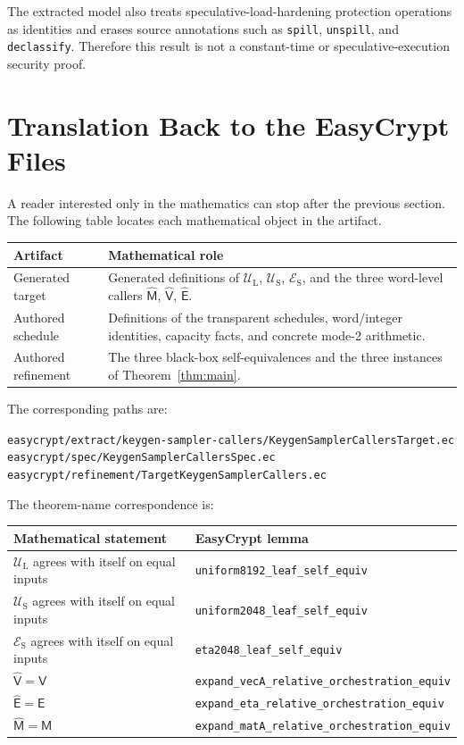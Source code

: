 \documentclass[11pt]{article}
\theoremstyle{definition}
\theoremstyle{plain}
\theoremstyle{remark}
\newcommand{\code}[1]{\nolinkurl{#1}}
\newcommand{\UL}{\mathcal U_{\mathrm L}}
\newcommand{\US}{\mathcal U_{\mathrm S}}
\newcommand{\ES}{\mathcal E_{\mathrm S}}
\newcommand{\SchedMat}{\mathsf M}
\newcommand{\SchedVec}{\mathsf V}
\newcommand{\SchedEta}{\mathsf E}
\newcommand{\GenMat}{\widehat{\mathsf M}}
\newcommand{\GenVec}{\widehat{\mathsf V}}
\newcommand{\GenEta}{\widehat{\mathsf E}}
\begin{document}
The extracted model also treats speculative-load-hardening protection
operations as identities and erases source annotations such as
\code{spill}, \code{unspill}, and \code{declassify}.  Therefore this result is
not a constant-time or speculative-execution security proof.

\section{Translation Back to the EasyCrypt Files}

A reader interested only in the mathematics can stop after the previous
section.  The following table locates each mathematical object in the artifact.

\noindent\begin{tabularx}{\textwidth}{>{\raggedright\arraybackslash}p{}X}
\toprule
Artifact & Mathematical role \\
\midrule
Generated target & Generated definitions of $\UL$, $\US$, $\ES$, and the three word-level
callers $\GenMat$, $\GenVec$, $\GenEta$. \\
Authored schedule & Definitions of the transparent schedules, word/integer identities, capacity
facts, and concrete mode-2 arithmetic. \\
Authored refinement & The three black-box self-equivalences and the three instances of
Theorem~\ref{thm:main}. \\
\bottomrule
\end{tabularx}

The corresponding paths are:
\begin{center}
\footnotesize
\code{easycrypt/extract/keygen-sampler-callers/KeygenSamplerCallersTarget.ec}\\
\code{easycrypt/spec/KeygenSamplerCallersSpec.ec}\\
\code{easycrypt/refinement/TargetKeygenSamplerCallers.ec}
\end{center}

The theorem-name correspondence is:
\begin{center}
\small
\begin{tabularx}{0.96\textwidth}{>{\raggedright\arraybackslash}p{}X}
\toprule
Mathematical statement & EasyCrypt lemma \\
\midrule
$\UL$ agrees with itself on equal inputs &
\code{uniform8192_leaf_self_equiv} \\
$\US$ agrees with itself on equal inputs &
\code{uniform2048_leaf_self_equiv} \\
$\ES$ agrees with itself on equal inputs &
\code{eta2048_leaf_self_equiv} \\
$\GenVec=\SchedVec$ & \code{expand_vecA_relative_orchestration_equiv} \\
$\GenEta=\SchedEta$ & \code{expand_eta_relative_orchestration_equiv} \\
$\GenMat=\SchedMat$ & \code{expand_matA_relative_orchestration_equiv} \\
\bottomrule
\end{tabularx}
\end{center}
\end{document}
